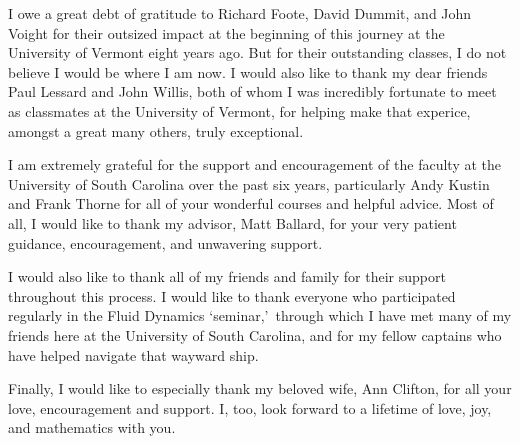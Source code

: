 I owe a great debt of gratitude to Richard Foote, David Dummit, and John Voight for their outsized impact at the beginning of this journey at the University of Vermont eight years ago.
But for their outstanding classes, I do not believe I would be where I am now.
I would also like to thank my dear friends Paul Lessard and John Willis, both of whom I was incredibly fortunate to meet as classmates at the University of Vermont, for helping make that experice, amongst a great many others, truly exceptional.

I am extremely grateful for the support and encouragement of the faculty at the University of South Carolina over the past six years, particularly Andy Kustin and Frank Thorne for all of your wonderful courses and helpful advice.
Most of all, I would like to thank my advisor, Matt Ballard, for your very patient guidance, encouragement, and unwavering support.

I would also like to thank all of my friends and family for their support throughout this process.
I would like to thank everyone who participated regularly in the Fluid Dynamics \lq seminar,\rq\, through which I have met many of my friends here at the University of South Carolina, and for my fellow captains who have helped navigate that wayward ship.

Finally, I would like to especially thank my beloved wife, Ann Clifton, for all your love, encouragement and support.
I, too, look forward to a lifetime of love, joy, and mathematics with you.
